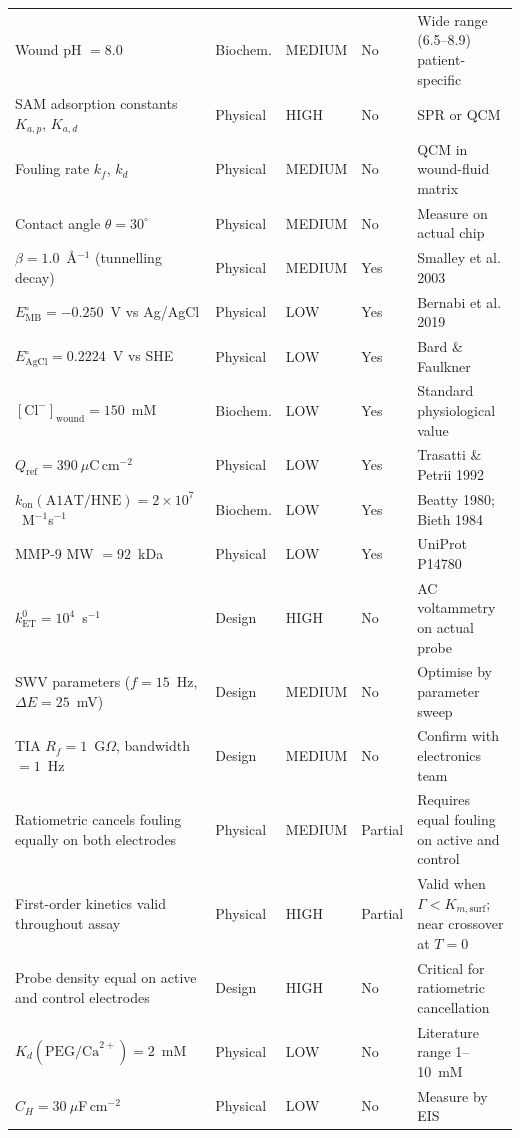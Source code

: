 \documentclass[10pt,a4paper]{article}
\begin{document}
{\begin{longtable}{p{5.1cm}p{2.0cm}p{1.6cm}p{1.7cm}p{4.1cm}}
Wound pH $= 8.0$ & Biochem. & MEDIUM & No & Wide range (6.5--8.9) patient-specific \\
SAM adsorption constants $K_{a,p}$, $K_{a,d}$ & Physical & HIGH & No & SPR or QCM \\
Fouling rate $k_f$, $k_d$ & Physical & MEDIUM & No & QCM in wound-fluid matrix \\
Contact angle $\theta = 30^\circ$ & Physical & MEDIUM & No & Measure on actual chip \\
$\beta = 1.0$~\AA$^{-1}$ (tunnelling decay) & Physical & MEDIUM & Yes & Smalley et al. 2003 \\
$E^\circ_\text{MB} = -0.250$~V vs Ag/AgCl & Physical & LOW & Yes & Bernabi et al. 2019 \\
$E^\circ_\text{AgCl} = 0.2224$~V vs SHE & Physical & LOW & Yes & Bard \& Faulkner \\
$[\text{Cl}^-]_\text{wound} = 150$~mM & Biochem. & LOW & Yes & Standard physiological value \\
$Q_\text{ref} = 390~\mu$C\,cm$^{-2}$ & Physical & LOW & Yes & Trasatti \& Petrii 1992 \\
$k_\text{on}(\text{A1AT/HNE}) = 2\times10^7$~M$^{-1}$s$^{-1}$ & Biochem. & LOW & Yes & Beatty 1980; Bieth 1984 \\
MMP-9 MW $= 92$~kDa & Physical & LOW & Yes & UniProt P14780 \\
$k_\text{ET}^0 = 10^4$~s$^{-1}$ & Design & HIGH & No & AC voltammetry on actual probe \\
SWV parameters ($f = 15$~Hz, $\Delta E = 25$~mV) & Design & MEDIUM & No & Optimise by parameter sweep \\
TIA $R_f = 1$~G$\Omega$, bandwidth $= 1$~Hz & Design & MEDIUM & No & Confirm with electronics team \\
Ratiometric cancels fouling equally on both electrodes & Physical & MEDIUM & Partial & Requires equal fouling on active and control \\
First-order kinetics valid throughout assay & Physical & HIGH & Partial & Valid when $\Gamma < K_{m,\text{surf}}$; near crossover at $T = 0$ \\
Probe density equal on active and control electrodes & Design & HIGH & No & Critical for ratiometric cancellation \\
$K_d(\text{PEG/Ca}^{2+}) = 2$~mM & Physical & LOW & No & Literature range 1--10~mM \\
$C_H = 30~\mu$F\,cm$^{-2}$ & Physical & LOW & No & Measure by EIS \\
\end{longtable}
}
\end{document}
